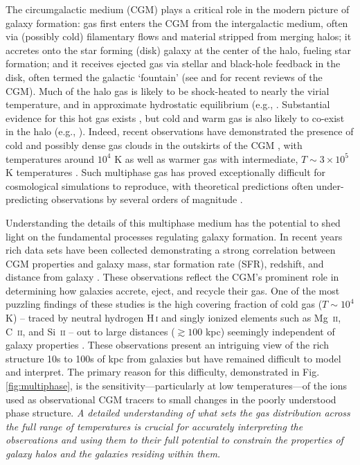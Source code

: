 \documentclass[11pt,letterpaper,english]{article}
\begin{document}
The circumgalactic medium (CGM) plays a critical role in the modern picture of galaxy formation: gas first enters the CGM from the intergalactic medium, often via (possibly cold) filamentary flows and material stripped from merging halos; it accretes onto the star forming (disk) galaxy at the center of the halo, fueling star formation; and it receives ejected gas via stellar and black-hole feedback in the disk, often termed the galactic `fountain' (see \cite{Tumlinson17} and \cite{Putman12} for recent reviews of the CGM).  Much of the halo gas is likely to be shock-heated to nearly the virial temperature, and in approximate hydrostatic equilibrium (e.g., \cite{White78, Fielding17}. Substantial evidence for this hot gas exists \cite{Bregman07}, but cold and warm gas is also likely to co-exist in the halo (e.g., \cite{Keres09, Wakker2009, Rigby02}). Indeed, recent observations have demonstrated the presence of cold and possibly dense gas clouds in the outskirts of the CGM \cite{Tumlinson13, Werk14, Lau16}, with temperatures around $10^4$ K as well as warmer gas with intermediate, $T \sim 3 \times 10^5$ K temperatures \cite{Chen2009, Prochaska2011}.  Such multiphase gas has proved exceptionally difficult for cosmological simulations to reproduce, with theoretical predictions often under-predicting observations by several orders of magnitude \cite{Hummels2013}.  

Understanding the details of this multiphase medium has the potential to shed light on the fundamental processes regulating galaxy formation. In recent years rich data sets have been collected demonstrating a strong correlation between CGM properties and galaxy mass, star formation rate (SFR), redshift, and distance from galaxy \cite{Tumlinson11, Bordoloi14, Borthakur15}. These observations reflect the CGM's prominent role in determining how galaxies accrete, eject, and recycle their gas. One of the most puzzling findings of these studies is the high covering fraction of cold gas ($T\sim10^4$ K) -- traced by neutral hydrogen H\,\textsc{i} and singly ionized elements such as Mg\ \textsc{ii}, C\ \textsc{ii}, and Si\ \textsc{ii} -- out to large distances ($\gtrsim 100$ kpc) seemingly independent of galaxy properties \cite{Thom12}. These observations present an intriguing view of the rich structure 10s to 100s of kpc from galaxies but have remained difficult to model and interpret. The primary reason for this difficulty, demonstrated in Fig.\,\ref{fig:multiphase}, 
is the sensitivity---particularly at low temperatures---of the ions used as observational CGM tracers to small changes in the poorly understood phase structure. 
\textit{A detailed understanding of what sets the gas distribution across the full range of temperatures is crucial for accurately interpreting the observations and using them to their full potential to constrain the properties of galaxy halos and the galaxies residing within them.}
\end{document}

